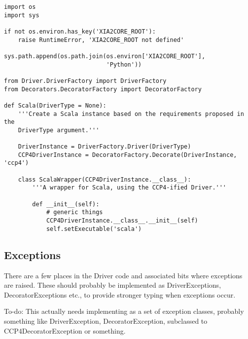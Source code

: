 \documentclass[a4paper, 11pt]{article}
\begin{document}
{
\tiny
\begin{verbatim}
import os
import sys

if not os.environ.has_key('XIA2CORE_ROOT'):
    raise RuntimeError, 'XIA2CORE_ROOT not defined'

sys.path.append(os.path.join(os.environ['XIA2CORE_ROOT'],
                             'Python'))

from Driver.DriverFactory import DriverFactory
from Decorators.DecoratorFactory import DecoratorFactory

def Scala(DriverType = None):
    '''Create a Scala instance based on the requirements proposed in the
    DriverType argument.'''

    DriverInstance = DriverFactory.Driver(DriverType)
    CCP4DriverInstance = DecoratorFactory.Decorate(DriverInstance, 'ccp4')

    class ScalaWrapper(CCP4DriverInstance.__class__):
        '''A wrapper for Scala, using the CCP4-ified Driver.'''

        def __init__(self):
            # generic things
            CCP4DriverInstance.__class__.__init__(self)
            self.setExecutable('scala')
\end{verbatim}
}

\subsection{Exceptions}

There are a few places in the Driver code and associated bits where exceptions
are raised. These should probably be implemented as DriverExceptions, 
DecoratorExceptions etc., to provide stronger typing when exceptions occur.

To-do: This actually needs implementing as a set of exception classes, 
probably something like DriverException, DecoratorException, subclassed to
CCP4DecoratorException or something.
\end{document}
